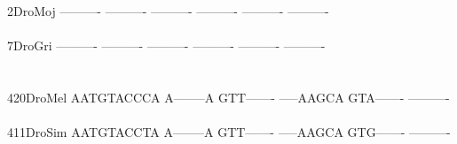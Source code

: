 \documentclass[11pt,twoside,reqno,a4paper]{article}
\begin{document}
{2\hspace*{4\charwidth}DroMoj	----------	----------	----------	----------	----------	----------	\\
\hspace*{5\charwidth}\hspace*{7\charwidth}\hspace*{1\charwidth}\hspace*{1\charwidth}\hspace*{1\charwidth}\hspace*{1\charwidth}\hspace*{1\charwidth}\hspace*{1\charwidth}\\
7\hspace*{4\charwidth}DroGri	----------	----------	----------	----------	----------	----------	\\
\hspace*{5\charwidth}\hspace*{7\charwidth}\hspace*{1\charwidth}\hspace*{1\charwidth}\hspace*{1\charwidth}\hspace*{1\charwidth}\hspace*{1\charwidth}\hspace*{1\charwidth}\\
\\
420\hspace*{2\charwidth}DroMel	AATGTACCCA	A--------A	GTT-------	-----AAGCA	GTA-------	----------	\\
\hspace*{5\charwidth}\hspace*{7\charwidth}\hspace*{1\charwidth}\hspace*{1\charwidth}\hspace*{1\charwidth}\hspace*{1\charwidth}\hspace*{1\charwidth}\hspace*{1\charwidth}\\
411\hspace*{2\charwidth}DroSim	AATGTACCTA	A--------A	GTT-------	-----AAGCA	GTG-------	----------	\\
\hspace*{5\charwidth}\hspace*{7\charwidth}\hspace*{1\charwidth}\hspace*{1\charwidth}\hspace*{1\charwidth}\hspace*{1\charwidth}\hspace*{1\charwidth}\hspace*{1\charwidth}\\
}
\end{document}
